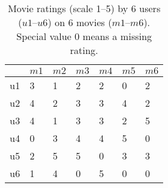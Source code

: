 \begin{table}[!h]
\begin{center}
\caption{Movie ratings (scale 1--5) by 6 users ($u1$--$u6$) on 6 movies 
($m1$--$m6$). Special value 0 means a missing rating.}
\label{movier}
\begin{tabular}{|l|l|l|l|l|l|l|}
\hline
&$m1$&$m2$&$m3$&$m4$&$m5$&$m6$\\
\hline
u1&3&1&2&2&0&2\\
u2&4&2&3&3&4&2\\
u3&4&1&3&3&2&5\\
u4&0&3&4&4&5&0\\
u5&2&5&5&0&3&3\\
u6&1&4&0&5&0&0\\
\hline
\end{tabular}
\end{center}
\end{table}

